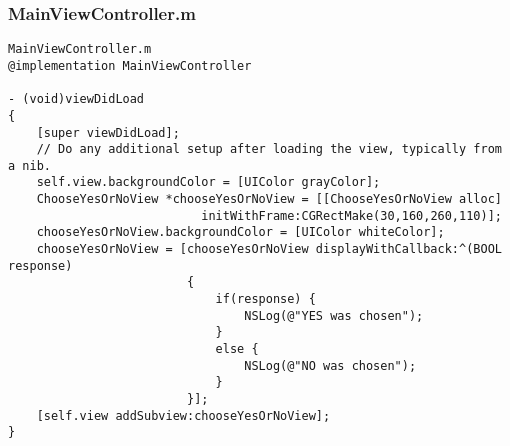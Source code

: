 \documentclass[12pt]{article}
\begin{document}
\subsubsection{MainViewController.m}
\begin{lstlisting}
MainViewController.m
@implementation MainViewController

- (void)viewDidLoad
{
    [super viewDidLoad];
	// Do any additional setup after loading the view, typically from a nib.
    self.view.backgroundColor = [UIColor grayColor];
    ChooseYesOrNoView *chooseYesOrNoView = [[ChooseYesOrNoView alloc]
                           initWithFrame:CGRectMake(30,160,260,110)];
    chooseYesOrNoView.backgroundColor = [UIColor whiteColor];
    chooseYesOrNoView = [chooseYesOrNoView displayWithCallback:^(BOOL response)
                         {
                             if(response) {
                                 NSLog(@"YES was chosen");
                             }
                             else {
                                 NSLog(@"NO was chosen");
                             }
                         }];
    [self.view addSubview:chooseYesOrNoView];
}

\end{lstlisting}
\end{document}
